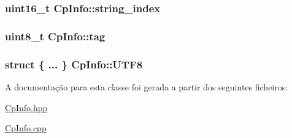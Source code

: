 \subsubsection[{\texorpdfstring{string\+\_\+index}{string_index}}]{\setlength{\rightskip}{0pt plus 5cm}uint16\+\_\+t Cp\+Info\+::string\+\_\+index}\hypertarget{class_cp_info_a4b2f7aa4ac461ac4d860d566c5e3323e}{}\label{class_cp_info_a4b2f7aa4ac461ac4d860d566c5e3323e}
\subsubsection[{\texorpdfstring{tag}{tag}}]{\setlength{\rightskip}{0pt plus 5cm}uint8\+\_\+t Cp\+Info\+::tag}\hypertarget{class_cp_info_ac20d96c33f871bde2e903708a215a2dc}{}\label{class_cp_info_ac20d96c33f871bde2e903708a215a2dc}
\subsubsection[{\texorpdfstring{U\+T\+F8}{UTF8}}]{\setlength{\rightskip}{0pt plus 5cm}struct \{ ... \}   Cp\+Info\+::\+U\+T\+F8}\hypertarget{class_cp_info_a1959c604c24ea0a8c2ab8a4f3094f3e0}{}\label{class_cp_info_a1959c604c24ea0a8c2ab8a4f3094f3e0}


A documentação para esta classe foi gerada a partir dos seguintes ficheiros\+:\begin{DoxyCompactItemize}
\item 
\hyperlink{_cp_info_8hpp}{Cp\+Info.\+hpp}\item 
\hyperlink{_cp_info_8cpp}{Cp\+Info.\+cpp}\end{DoxyCompactItemize}
